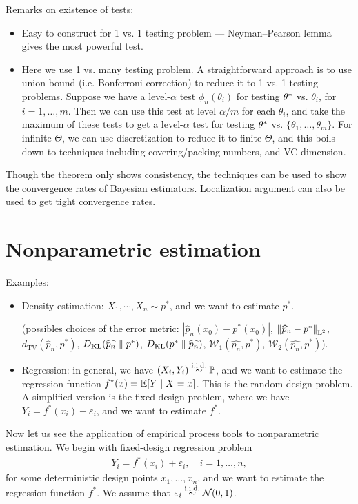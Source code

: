 \documentclass[11pt,letterpaper]{article}
\numberwithin{theorem}{lecture}
\numberwithin{proposition}{lecture}
\numberwithin{lemma}{lecture}
\numberwithin{claim}{lecture}
\numberwithin{corollary}{lecture}
\numberwithin{definition}{lecture}
\numberwithin{conjecture}{lecture}
\numberwithin{remark}{lecture}
\numberwithin{example}{lecture}
\numberwithin{equation}{lecture}
\begin{document}
\bigskip

Remarks on existence of tests:
\begin{itemize}
  \item Easy to construct for 1 vs. 1 testing problem --- Neyman--Pearson lemma gives the most powerful test.
  \item Here we use 1 vs. many testing problem. A straightforward approach is to use union bound (i.e. Bonferroni correction) to reduce it to 1 vs. 1 testing problems. Suppose we have a level-$\alpha$ test $\phi_n (\theta_i)$ for testing ${\theta^*}$ vs. $\theta_i$, for $i = 1, \ldots, m$. Then we can use this test at level $\alpha / m$ for each $\theta_i$, and take the maximum of these tests to get a level-$\alpha$ test for testing ${\theta^*}$ vs. $\{\theta_1, \ldots, \theta_m\}$. For infinite $\Theta$, we can use discretization to reduce it to finite $\Theta$, and this boils down to techniques including covering/packing numbers, and VC dimension.
\end{itemize}
Though the theorem only shows consistency, the techniques can be used to show the convergence rates of Bayesian estimators. Localization argument can also be used to get tight convergence rates.

\section{Nonparametric estimation}
Examples:
\begin{itemize}
  \item Density estimation: $X_1, \cdots, X_n \sim p^*$, and we want to estimate $p^*$.

  (possibles choices of the error metric: $|\widehat{p}_n (x_0) - p^* (x_0)|$,
  $\left\| \widehat{p}_n - p^*\right\|_{\mathbb{L}^2}$,
  $d_{\mathrm{TV}}(\widehat{p}_n, p^*)$, $D_{\text{KL}}(\widehat{p_n}\; \| \; p^*)$,
  $D_{\text{KL}}(p^*\; \| \; \widehat{p_n})$, $\mathcal{W}_1 (\widehat{p_n}, p^*)$,
  $\mathcal{W}_2 (\widehat{p_n}, p^*)$).
  \item Regression: in general, we have $(X_i, Y_i) \overset{\mathrm{i.i.d.}}{\sim} {\mathbb{P}}$, and we want to estimate the regression function $f^* (x) = {\mathbb{E}}[Y \mid X = x]$. This is the random design problem. A simplified version is the fixed design problem, where we have $Y_i = f^* (x_i) + \varepsilon_i$, and we want to estimate $f^*$.
\end{itemize}

Now let us see the application of empirical process tools to nonparametric estimation. We begin with fixed-design regression problem
\begin{align*}
  Y_i = f^* (x_i) + \varepsilon_i, \quad i = 1, \ldots, n,
\end{align*}
for some deterministic design points $x_1, \ldots, x_n$, and we want to estimate the regression function $f^*$. We assume that $\varepsilon_i \overset{\mathrm{i.i.d.}}{\sim} \mathcal{N} (0, 1)$.
\end{document}
